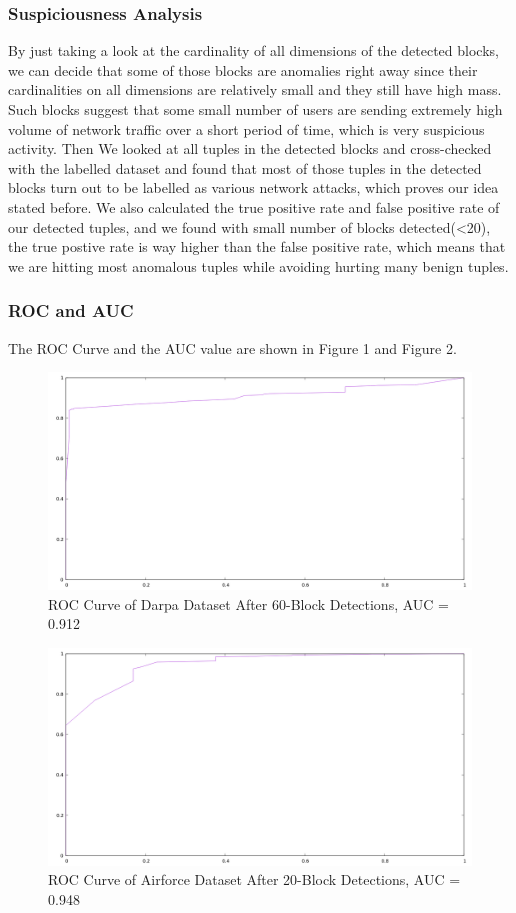 \subsubsection{Suspiciousness Analysis}
By just taking a look at the cardinality of all dimensions of the detected blocks, we can decide that some of those blocks are
anomalies right away since their cardinalities on all dimensions are relatively small and they still have high mass. Such blocks
suggest that some small number of users are sending extremely high volume of network traffic over a short period of time, which is very
suspicious activity.
Then We looked at all tuples in the detected blocks and cross-checked with the labelled dataset and found that most of those tuples in
the detected blocks turn out to be labelled as various network attacks, which proves our idea stated before. We also calculated
the true positive rate and false positive rate of our detected tuples, and we found with small number of blocks detected(<20), the true
postive rate is way higher than the false positive rate, which means that we are hitting most anomalous tuples while avoiding hurting many
benign tuples.

\newpage
\subsubsection{ROC and AUC}
The ROC Curve and the AUC value are shown in Figure 1 and Figure 2.
\begin{figure}[!ht]
\includegraphics[scale=0.5]{roc1.png}
\caption{ROC Curve of Darpa Dataset After 60-Block Detections, AUC = 0.912}
\end{figure}

\begin{figure}[!ht]
\includegraphics[scale=0.5]{roc2.png}
\caption{ROC Curve of Airforce Dataset After 20-Block Detections, AUC = 0.948}
\end{figure}
